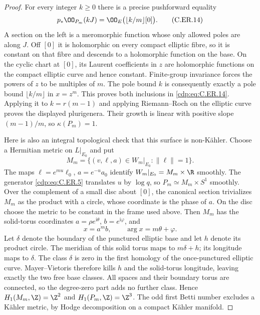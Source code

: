 \begin{proof}
For every integer $k\ge0$ there is a precise pushforward equality
\[
        p_*\OO_{P_m}(kJ)
          =\OO_E\bigl(\lfloor k/m\rfloor[0]\bigr).
                                                        \tag{C.ER.14}\label{cdp:eq:C.ER.14}
\]
A section on the left is a meromorphic function whose only allowed
poles are along $J$. Off $[0]$ it is holomorphic on every compact
elliptic fibre, so it is constant on that fibre and descends to a
holomorphic function on the base. On the cyclic chart at $[0]$,
its Laurent coefficients in $z$ are holomorphic functions on the
compact elliptic curve and hence constant. Finite-group invariance
forces the powers of $z$ to be multiples of $m$. The pole bound
$k$ is consequently exactly a pole bound $\lfloor k/m\rfloor$
in $x=z^m$. This proves both inclusions in \eqref{cdp:eq:C.ER.14}.
Applying it to $k=r(m-1)$ and applying Riemann--Roch on the elliptic
curve proves the displayed plurigenera. Their growth is linear
with positive slope $(m-1)/m$, so $\kappa(P_m)=1$.

Here is also an integral topological check that this surface is
non-K\"ahler. Choose a Hermitian metric on $L|_{E_0}$ and put
\[
 M_m=\{(v,\ell,a)\in W_m|_{E_0}:\|\ell\|=1\}.
                                                        \tag{C.ER.15}\label{cdp:eq:C.ER.15}
\]
The maps $\ell=e^{mu}\ell_0$, $a=e^{-u}a_0$ identify
$W_m|_{E_0}=M_m\times\R$ smoothly. The generator \eqref{cdp:eq:C.ER.5}
translates $u$ by $\log q$, so
$P_m\simeq M_m\times S^1$ smoothly. Over the complement of a
small disc about $[0]$, the canonical section trivializes $M_m$
as the product with a circle, whose coordinate is the phase of $a$.
On the disc choose the metric to be constant in the frame used
above. Then $M_m$ has the solid-torus coordinates
$a=\rho e^{\mathrm i\theta}$, $b=e^{\mathrm i\varphi}$, and
\[
              x=a^m b,\qquad \arg x=m\theta+\varphi.
                                                        \tag{C.ER.16}\label{cdp:eq:C.ER.16}
\]
Let $\delta$ denote the boundary of the punctured elliptic base
and let $h$ denote its product circle. The meridian of this solid
torus maps to $m\delta+h$; its longitude maps to $\delta$.
The class $\delta$ is zero in the first homology of the once-punctured
elliptic curve. Mayer--Vietoris therefore kills $h$ and the solid-torus
longitude, leaving exactly the two free base classes. All spaces
and their boundary torus are connected, so the degree-zero part
adds no further class. Hence
$H_1(M_m,\Z)=\Z^2$ and $H_1(P_m,\Z)=\Z^3$.
The odd first Betti number excludes a K\"ahler metric, by Hodge
decomposition on a compact K\"ahler manifold.


\end{proof}
